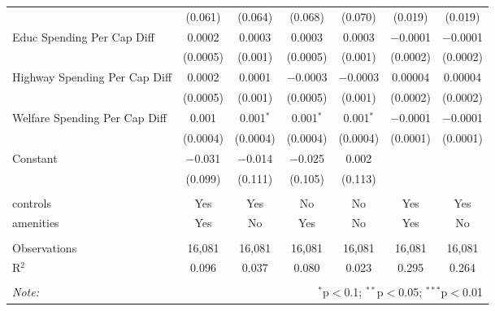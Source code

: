\begin{table}[!htbp]
\begin{tabular}{@{\extracolsep{5pt}}lcccccc}
  & (0.061) & (0.064) & (0.068) & (0.070) & (0.019) & (0.019) \\ 
  Educ Spending Per Cap Diff & 0.0002 & 0.0003 & 0.0003 & 0.0003 & $-$0.0001 & $-$0.0001 \\ 
  & (0.0005) & (0.001) & (0.0005) & (0.001) & (0.0002) & (0.0002) \\ 
  Highway Spending Per Cap Diff & 0.0002 & 0.0001 & $-$0.0003 & $-$0.0003 & 0.00004 & 0.00004 \\ 
  & (0.0005) & (0.001) & (0.0005) & (0.001) & (0.0002) & (0.0002) \\ 
  Welfare Spending Per Cap Diff & 0.001 & 0.001$^{*}$ & 0.001$^{*}$ & 0.001$^{*}$ & $-$0.0001 & $-$0.0001 \\ 
  & (0.0004) & (0.0004) & (0.0004) & (0.0004) & (0.0001) & (0.0001) \\ 
  Constant & $-$0.031 & $-$0.014 & $-$0.025 & 0.002 &  &  \\ 
  & (0.099) & (0.111) & (0.105) & (0.113) &  &  \\ 
 \hline \\[-1.8ex] 
controls & Yes & Yes & No & No & Yes & Yes \\ 
amenities & Yes & No & Yes & No & Yes & No \\ 
\hline \\[-1.8ex] 
Observations & 16,081 & 16,081 & 16,081 & 16,081 & 16,081 & 16,081 \\ 
R$^{2}$ & 0.096 & 0.037 & 0.080 & 0.023 & 0.295 & 0.264 \\ 
\hline 
\hline \\[-1.8ex] 
\textit{Note:}  & \multicolumn{6}{r}{$^{*}$p$<$0.1; $^{**}$p$<$0.05; $^{***}$p$<$0.01} \\ 
\end{tabular} 
\end{table} 
